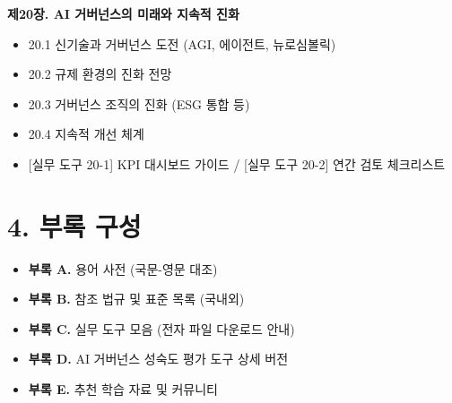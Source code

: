 \medskip
\textbf{제20장. AI 거버넌스의 미래와 지속적 진화}
\begin{itemize}
 \item 20.1 신기술과 거버넌스 도전 (AGI, 에이전트, 뉴로심볼릭)
 \item 20.2 규제 환경의 진화 전망
 \item 20.3 거버넌스 조직의 진화 (ESG 통합 등)
 \item 20.4 지속적 개선 체계
 \item {[실무 도구 20-1] KPI 대시보드 가이드} / {[실무 도구 20-2] 연간 검토 체크리스트}
\end{itemize}

\vspace{1cm}
\section*{4. 부록 구성}

\begin{itemize}
 \item \textbf{부록 A.} 용어 사전 (국문-영문 대조)
 \item \textbf{부록 B.} 참조 법규 및 표준 목록 (국내외)
 \item \textbf{부록 C.} 실무 도구 모음 (전자 파일 다운로드 안내)
 \item \textbf{부록 D.} AI 거버넌스 성숙도 평가 도구 상세 버전
 \item \textbf{부록 E.} 추천 학습 자료 및 커뮤니티
\end{itemize}
